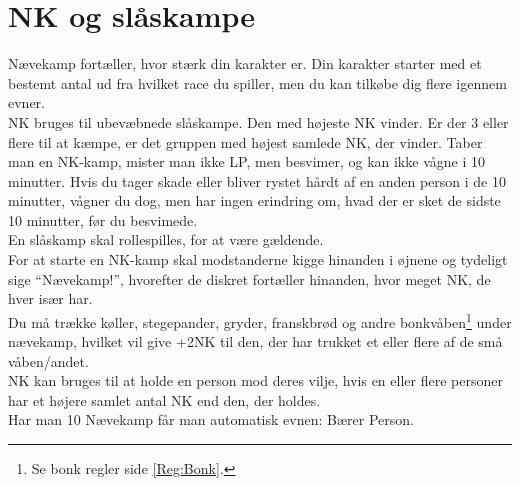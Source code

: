 \section{NK og slåskampe}
Nævekamp fortæller, hvor stærk din karakter er. Din karakter starter med et bestemt antal ud fra hvilket race du spiller, men du kan tilkøbe dig flere igennem evner.\\
NK bruges til ubevæbnede slåskampe. Den med højeste NK vinder. Er der 3 eller flere til at kæmpe, er det gruppen med højest samlede NK, der vinder. Taber man en NK-kamp, mister man ikke LP, men besvimer, og kan ikke vågne i 10 minutter. Hvis du tager skade eller bliver rystet hårdt af en anden person i de 10 minutter, vågner du dog, men har ingen erindring om, hvad der er sket de sidste 10 minutter, før du besvimede.\\
En slåskamp skal rollespilles, for at være gældende.\\
For at starte en NK-kamp skal modstanderne kigge hinanden i øjnene og tydeligt sige “Nævekamp!”, hvorefter de diskret fortæller hinanden, hvor meget NK, de hver især har.\\
Du må trække  køller, stegepander, gryder, franskbrød og andre bonkvåben\footnote{Se bonk regler side \ref{Reg:Bonk}.} under nævekamp, hvilket vil give +2NK til den, der har trukket et eller flere af de små våben/andet.\\
NK kan bruges til at holde en person mod deres vilje, hvis en eller flere personer har et højere samlet antal NK end den, der holdes.\\
Har man 10 Nævekamp får man automatisk evnen: Bærer Person.

